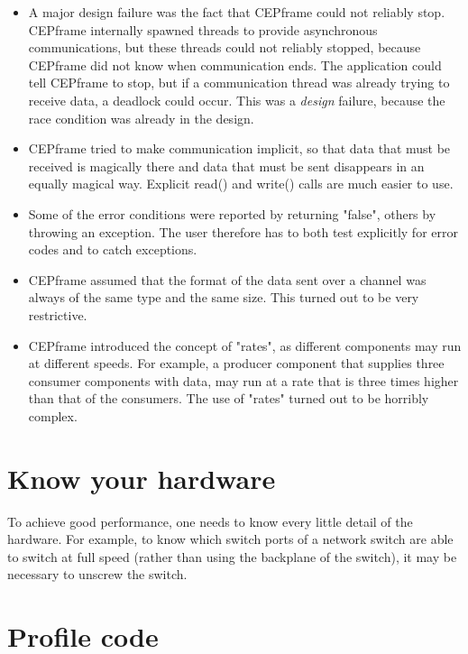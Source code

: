 \documentclass[article]{sig-alternate}
\begin{document}
\begin{itemize}
\item
A major design failure was the fact that CEPframe could not reliably stop.
CEPframe internally spawned threads to provide asynchronous communications,
but these threads could not reliably stopped, because CEPframe did not know
when communication ends.
The application could tell CEPframe to stop, but if a communication thread
was already trying to receive data, a deadlock could occur.
This was a \emph{design\/} failure, because the race condition was already
in the design.

\item
CEPframe tried to make communication implicit, so that data that must be
received is magically there and data that must be sent disappears in an
equally magical way.
Explicit read() and write() calls are much easier to use.

\item
Some of the error conditions were reported by returning "false", others
by throwing an exception.
The user therefore has to both test explicitly for error codes and to catch
exceptions.

\item
CEPframe assumed that the format of the data sent over a channel was always
of the same type and the same size.
This turned out to be very restrictive.

\item
CEPframe introduced the concept of "rates", as different components may run
at different speeds.
For example, a producer component that supplies three consumer components
with data, may run at a rate that is three times higher than that of the
consumers.
The use of "rates" turned out to be horribly complex.
\end{itemize}



\section{Know your hardware}

To achieve good performance, one needs to know every little detail of the
hardware.
For example, to know which switch ports of a network switch are able to
switch at full speed (rather than using the backplane of the switch),
it may be necessary to unscrew the switch.

\section{Profile code}
\end{document}
